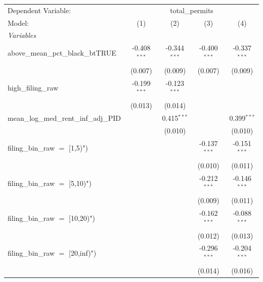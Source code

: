 \begingroup
\centering
\begin{tabular}{lcccc}
   \tabularnewline \midrule \midrule
   Dependent Variable: & \multicolumn{4}{c}{total\_permits}\\
   Model:                                    & (1)            & (2)            & (3)            & (4)\\  
   \midrule
   \emph{Variables}\\
   above\_mean\_pct\_black\_btTRUE           & -0.408$^{***}$ & -0.344$^{***}$ & -0.400$^{***}$ & -0.337$^{***}$\\   
                                             & (0.007)        & (0.009)        & (0.007)        & (0.009)\\   
   high\_filing\_raw                         & -0.199$^{***}$ & -0.123$^{***}$ &                &   \\   
                                             & (0.013)        & (0.014)        &                &   \\   
   mean\_log\_med\_rent\_inf\_adj\_PID       &                & 0.415$^{***}$  &                & 0.399$^{***}$\\   
                                             &                & (0.010)        &                & (0.010)\\   
   filing\_bin\_raw $=$ [1,5)")              &                &                & -0.137$^{***}$ & -0.151$^{***}$\\   
                                             &                &                & (0.010)        & (0.011)\\   
   filing\_bin\_raw $=$ [5,10)")             &                &                & -0.212$^{***}$ & -0.146$^{***}$\\   
                                             &                &                & (0.009)        & (0.011)\\   
   filing\_bin\_raw $=$ [10,20)")            &                &                & -0.162$^{***}$ & -0.088$^{***}$\\   
                                             &                &                & (0.012)        & (0.013)\\   
   filing\_bin\_raw $=$ [20,inf)")           &                &                & -0.296$^{***}$ & -0.204$^{***}$\\   
                                             &                &                & (0.014)        & (0.016)\\   
   \midrule

\end{tabular}
